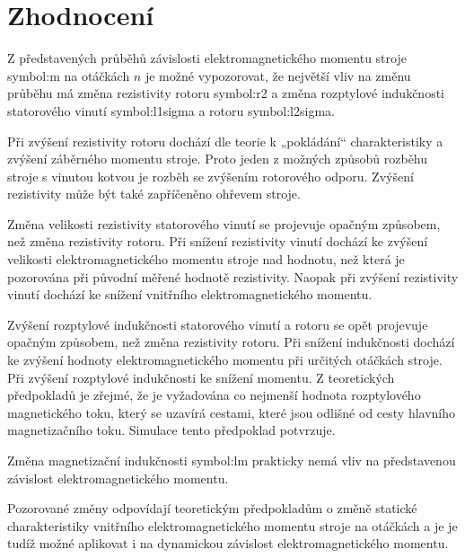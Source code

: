 \documentclass[a4paper, twoside, 11pt]{article}
\begin{document}
\newpage
{} 
\section*{Zhodnocení}
Z představených průběhů závislosti elektromagnetického momentu stroje \gls{symbol:m} na otáčkách $n$ je možné vypozorovat, že největší vliv na změnu průběhu má změna rezistivity rotoru \gls{symbol:r2} a změna rozptylové indukčnosti statorového vinutí \gls{symbol:l1sigma} a rotoru \gls{symbol:l2sigma}.\par
Při zvýšení rezistivity rotoru dochází dle teorie k „pokládání“ charakteristiky a zvýšení záběrného momentu stroje. Proto jeden z možných způsobů rozběhu stroje s vinutou kotvou je rozběh se zvýšením rotorového odporu. Zvýšení rezistivity může být také zapříčeněno ohřevem stroje.\par
Změna velikosti rezistivity statorového vinutí se projevuje opačným způsobem, než změna rezistivity rotoru. Při snížení rezistivity vinutí dochází ke zvýšení velikosti elektromagnetického momentu stroje nad hodnotu, než která je pozorována při původní měřené hodnotě rezistivity. Naopak při zvýšení rezistivity vinutí dochází ke snížení vnitřního elektromagnetického momentu.\par
Zvýšení rozptylové indukčnosti statorového vinutí a rotoru se opět projevuje opačným způsobem, než změna rezistivity rotoru. Při snížení indukčnosti dochází ke zvýšení hodnoty elektromagnetického momentu při určitých otáčkách stroje. Při zvýšení rozptylové indukčnosti ke snížení momentu. Z teoretických předpokladů je zřejmé, že je vyžadována co nejmenší hodnota rozptylového magnetického toku, který se uzavírá cestami, které jsou odlišné od cesty hlavního magnetizačního toku. Simulace tento předpoklad potvrzuje.\par
Změna magnetizační indukčnosti \gls{symbol:lm} prakticky nemá vliv na představenou závislost elektromagnetického momentu.\par
Pozorované změny odpovídají teoretickým předpokladům o změně statické charakteristiky vnitřního elektromagnetického momentu stroje na otáčkách a je je tudíž možné aplikovat i na dynamickou závislost elektromagnetického momentu.

\flushbottom %

\end{document}
